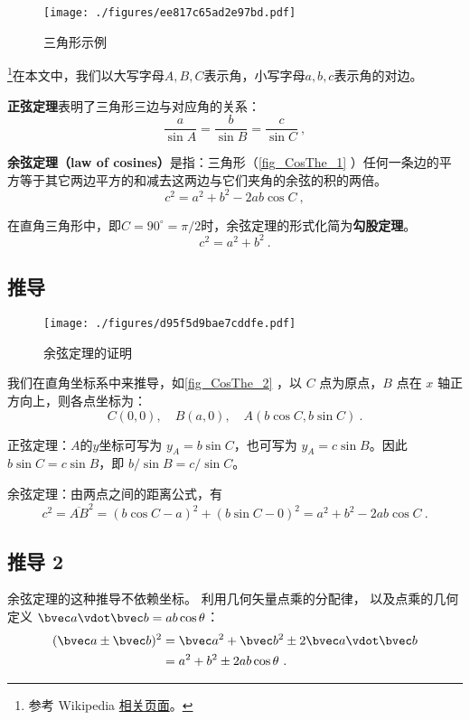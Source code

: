
\begin{figure}[ht]
\centering
\texttt{[image: ./figures/ee817c65ad2e97bd.pdf]}
\caption{三角形示例} \label{fig_CosThe_1}
\end{figure}

\footnote{参考 Wikipedia \href{https://en.wikipedia.org/wiki/Law_of_cosines}{相关页面}。}在本文中，我们以大写字母$A, B, C$表示角，小写字母$a, b, c$表示角的对边。

\textbf{正弦定理}表明了三角形三边与对应角的关系：
\begin{equation}
\frac{a}{\sin A} = \frac{b}{\sin B} = \frac{c}{\sin C} ~,
\end{equation}

\textbf{余弦定理（law of cosines）}是指：三角形（\autoref{fig_CosThe_1} ）任何一条边的平方等于其它两边平方的和减去这两边与它们夹角的余弦的积的两倍。
\begin{equation}\label{eq_CosThe_1}
c^2=a^2 + b^2 - 2ab\cos C~,
\end{equation}

在直角三角形中，即$C=90^\circ = \pi / 2$时，余弦定理的形式化简为\textbf{勾股定理}。
\begin{equation}
c^2 = a^2 + b^2~.
\end{equation}

\subsection{推导}
\begin{figure}[ht]
\centering
\texttt{[image: ./figures/d95f5d9bae7cddfe.pdf]}
\caption{余弦定理的证明} \label{fig_CosThe_2}
\end{figure}
我们在直角坐标系中来推导，如\autoref{fig_CosThe_2} ，以 $C$ 点为原点，$B$ 点在 $x$ 轴正方向上，则各点坐标为：
\begin{equation}
C(0,0),\quad B(a,0),\quad A(b\cos C,b\sin C)~.
\end{equation}

正弦定理：$A$的$y$坐标可写为 $y_A = b \sin C$，也可写为 $y_A = c \sin B$。因此 $b \sin C = c \sin B$，即 $b/ \sin B = c / \sin C$。

余弦定理：由两点之间的距离公式，有
\begin{equation}
c^2=\overline{AB}^2=(b\cos C-a)^2+(b\sin C-0)^2=a^2+b^2-2ab\cos C~.
\end{equation}

\subsection{推导 2}
余弦定理的这种推导不依赖坐标。 利用几何矢量点乘的分配律， 以及点乘的几何定义 $\bvec a \vdot \bvec b = ab\cos\theta$：
\begin{equation}\label{eq_CosThe_2}
\begin{aligned}
(\bvec a \pm \bvec b)^2 &= \bvec a^2 + \bvec b^2 \pm 2\bvec a \vdot \bvec b\\
&= a^2 + b^2 \pm 2ab \cos\theta~.
\end{aligned}
\end{equation}
